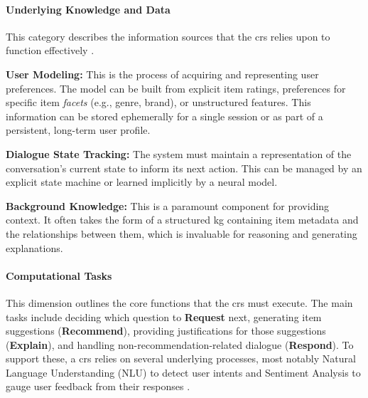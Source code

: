 \paragraph{Underlying Knowledge and Data}
This category describes the information sources that the \ac{crs} relies upon to function effectively \cite[Section 4]{SOTA-CRS-SURVEY}.
\begin{compactitem}[\textbullet]
    \item \textbf{User Modeling:} This is the process of acquiring and representing user preferences. The model can be built from explicit item ratings, preferences for specific item \textit{facets} (e.g., genre, brand), or unstructured features. This information can be stored ephemerally for a single session or as part of a persistent, long-term user profile.
    \item \textbf{Dialogue State Tracking:} The system must maintain a representation of the conversation's current state to inform its next action. This can be managed by an explicit state machine or learned implicitly by a neural model.
    \item \textbf{Background Knowledge:} This is a paramount component for providing context. It often takes the form of a structured \acl{kg} containing item metadata and the relationships between them, which is invaluable for reasoning and generating explanations.
\end{compactitem}

\paragraph{Computational Tasks}
This dimension outlines the core functions that the \ac{crs} must execute. The main tasks include deciding which question to \textbf{Request} next, generating item suggestions (\textbf{Recommend}), providing justifications for those suggestions (\textbf{Explain}), and handling non-recommendation-related dialogue (\textbf{Respond}). To support these, a \ac{crs} relies on several underlying processes, most notably Natural Language Understanding (NLU) to detect user intents and Sentiment Analysis to gauge user feedback from their responses \cite[Section 5]{SOTA-CRS-SURVEY}.